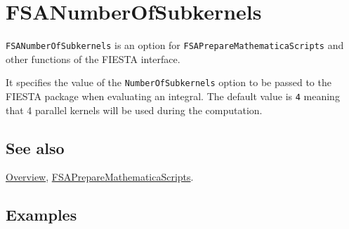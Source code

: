 \documentclass[../FeynHelpersManual.tex]{subfiles}
\begin{document}
\hypertarget{fsanumberofsubkernels}{
\section{FSANumberOfSubkernels}\label{fsanumberofsubkernels}}

\texttt{FSANumberOfSubkernels} is an option for
\texttt{FSAPrepareMathematicaScripts} and other functions of the FIESTA
interface.

It specifies the value of the \texttt{NumberOfSubkernels} option to be
passed to the FIESTA package when evaluating an integral. The default
value is \texttt{4} meaning that 4 parallel kernels will be used during
the computation.

\subsection{See also}

\hyperlink{toc}{Overview},
\hyperlink{fsapreparemathematicascripts}{FSAPrepareMathematicaScripts}.

\subsection{Examples}
\end{document}
